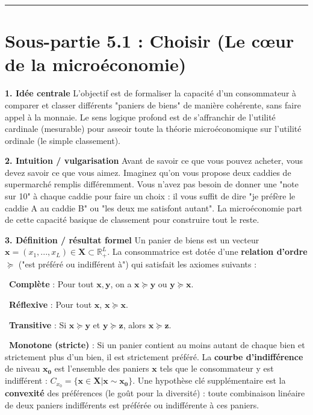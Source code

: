 \documentclass[11pt, a4paper]{report}
\begin{document}
\vspace{1cm}\hrule\vspace{1cm}

\section{Sous-partie 5.1 : Choisir (Le cœur de la microéconomie)}

\textbf{1. Idée centrale}
L'objectif est de formaliser la capacité d'un consommateur à comparer et classer différents "paniers de biens" de manière cohérente, sans faire appel à la monnaie. Le sens logique profond est de s'affranchir de l'utilité cardinale (mesurable) pour asseoir toute la théorie microéconomique sur l'utilité ordinale (le simple classement).

\textbf{2. Intuition / vulgarisation}
Avant de savoir ce que vous pouvez acheter, vous devez savoir ce que vous aimez. Imaginez qu'on vous propose deux caddies de supermarché remplis différemment. Vous n'avez pas besoin de donner une "note sur 10" à chaque caddie pour faire un choix : il vous suffit de dire "je préfère le caddie A au caddie B" ou "les deux me satisfont autant". La microéconomie part de cette capacité basique de classement pour construire tout le reste.

\textbf{3. Définition / résultat formel}
Un panier de biens est un vecteur $\mathbf{x} = (x_1, ..., x_L) \in \mathbf{X} \subset \mathbb{R}^L_+$.
La consommatrice est dotée d'une \textbf{relation d'ordre $\succeq$} ("est préféré ou indifférent à") qui satisfait les axiomes suivants :
\par \textbullet\ \textbf{Complète} : Pour tout $\mathbf{x}, \mathbf{y}$, on a $\mathbf{x} \succeq \mathbf{y}$ ou $\mathbf{y} \succeq \mathbf{x}$.
\par \textbullet\ \textbf{Réflexive} : Pour tout $\mathbf{x}$, $\mathbf{x} \succeq \mathbf{x}$.
\par \textbullet\ \textbf{Transitive} : Si $\mathbf{x} \succeq \mathbf{y}$ et $\mathbf{y} \succeq \mathbf{z}$, alors $\mathbf{x} \succeq \mathbf{z}$.
\par \textbullet\ \textbf{Monotone (stricte)} : Si un panier contient au moins autant de chaque bien et strictement plus d'un bien, il est strictement préféré.
La \textbf{courbe d'indifférence} de niveau $\mathbf{x_0}$ est l'ensemble des paniers $\mathbf{x}$ tels que le consommateur y est indifférent : $C_{x_0} = \{\mathbf{x} \in \mathbf{X} | \mathbf{x} \sim \mathbf{x_0}\}$. Une hypothèse clé supplémentaire est la \textbf{convexité} des préférences (le goût pour la diversité) : toute combinaison linéaire de deux paniers indifférents est préférée ou indifférente à ces paniers.
\end{document}
